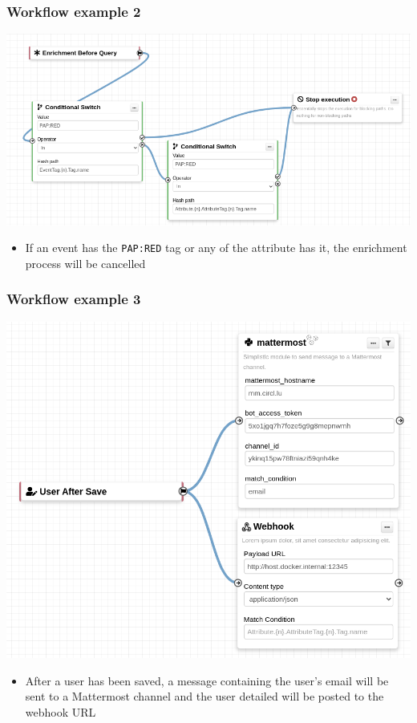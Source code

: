 \begin{frame}
    \frametitle{Workflow example 2}
    \begin{center}
        \includegraphics[width=0.95\linewidth]{pictures/example-2.png}
    \end{center}

    \begin{itemize}
        \item If an event has the \texttt{PAP:RED} tag or any of the attribute has it, the enrichment process will be cancelled
    \end{itemize}
\end{frame}

\begin{frame}
    \frametitle{Workflow example 3}
    \begin{center}
        \includegraphics[width=0.65\linewidth]{pictures/example-3.png}
    \end{center}

    \begin{itemize}
        \item After a user has been saved, a message containing the user's email will be sent to a Mattermost channel and the user detailed will be posted to the webhook URL
    \end{itemize}
\end{frame}
